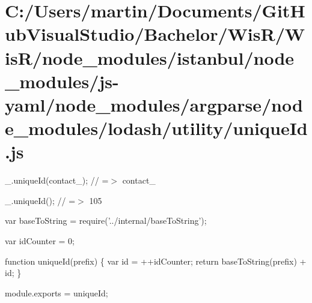 \hypertarget{_c_1_2_users_2martin_2_documents_2_git_hub_visual_studio_2_bachelor_2_wis_r_2_wis_r_2node_module4ecbb4ec0681997d0f9bff42112b07a6}{}\section{C\+:/\+Users/martin/\+Documents/\+Git\+Hub\+Visual\+Studio/\+Bachelor/\+Wis\+R/\+Wis\+R/node\+\_\+modules/istanbul/node\+\_\+modules/js-\/yaml/node\+\_\+modules/argparse/node\+\_\+modules/lodash/utility/unique\+Id.\+js}
\+\_\+.\+unique\+Id(\textquotesingle{}contact\+\_\+\textquotesingle{}); // =$>$ \textquotesingle{}contact\+\_\textquotesingle{}

\+\_\+.\+unique\+Id(); // =$>$ \textquotesingle{}105\textquotesingle{}


\begin{DoxyCodeInclude}
var baseToString = require(\textcolor{stringliteral}{'../internal/baseToString'});

var idCounter = 0;

\textcolor{keyword}{function} uniqueId(prefix) \{
  var \textcolor{keywordtype}{id} = ++idCounter;
  \textcolor{keywordflow}{return} baseToString(prefix) + id;
\}

module.exports = uniqueId;
\end{DoxyCodeInclude}
 